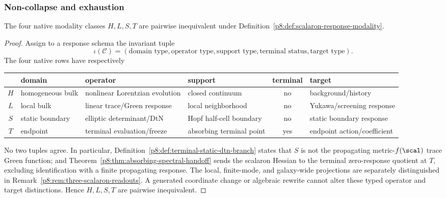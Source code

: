 \documentclass[12pt,a4paper]{article}
\begin{document}
\subsubsection{Non-collapse and exhaustion}

\begin{lemma}
\label{p8:lem:scalaron-native-modalities-noncollapse}
The four native modality classes $H,L,S,T$ are pairwise inequivalent under
Definition~\ref{p8:def:scalaron-response-modality}.
\end{lemma}

\begin{proof}
Assign to a response schema the invariant tuple
\[
\iota(\mathcal C)
=
(\text{domain type},\text{operator type},\text{support type},
 \text{terminal status},\text{target type}).
\]
The four native rows have respectively
\begingroup\small
\renewcommand{\arraystretch}{1.25}
\setlength{\tabcolsep}{3pt}
\begin{xltabular}{\linewidth}{@{}c|>{\raggedright\arraybackslash}p{.17\linewidth}|>{\raggedright\arraybackslash}p{.20\linewidth}|>{\raggedright\arraybackslash}p{.16\linewidth}|c|>{\raggedright\arraybackslash}X@{}}
&domain&operator&support&terminal&target\\\hline
\(H\)&homogeneous bulk&nonlinear Lorentzian evolution&closed continuum&no&background/history\\
\(L\)&local bulk&linear trace/Green response&local neighborhood&no&Yukawa/screening response\\
\(S\)&static boundary&elliptic determinant/DtN&Hopf half-cell boundary&no&static boundary response\\
\(T\)&endpoint&terminal evaluation/freeze&absorbing terminal point&yes&endpoint action/coefficient\\
\end{xltabular}
\endgroup
No two tuples agree.  In particular,
Definition~\ref{p8:def:terminal-static-dtn-branch} states that $S$ is not the
propagating metric-$f(\scal)$ trace Green function; and
Theorem~\ref{p8:thm:absorbing-spectral-handoff} sends the scalaron Hessian to
the terminal zero-response quotient at \(T\), excluding identification with a
finite propagating response.  The
local, finite-mode, and galaxy-wide projections are separately
distinguished in Remark~\ref{p8:rem:three-scalaron-readouts}.  A generated
coordinate change or algebraic rewrite cannot alter these typed operator and
target distinctions.  Hence $H,L,S,T$ are pairwise inequivalent. \qedhere
\end{proof}
\end{document}
